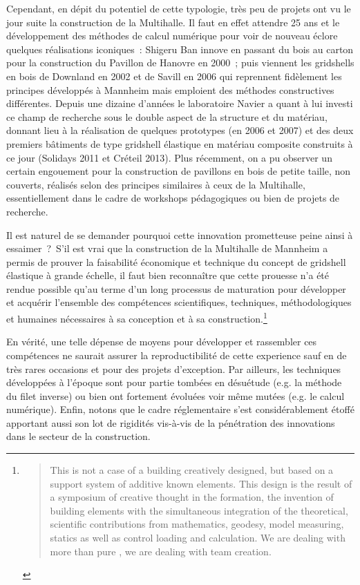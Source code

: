 Cependant, en dépit du potentiel de cette typologie, très peu de projets ont vu le jour suite la construction de la Multihalle. Il faut en effet attendre 25 ans et le développement des méthodes de calcul numérique pour voir de nouveau éclore quelques réalisations iconiques~: Shigeru Ban innove en passant du bois au carton pour la construction du Pavillon de Hanovre en 2000~; puis viennent les gridshells en bois de Downland en 2002 et de Savill en 2006 qui reprennent fidèlement les principes développés à Mannheim mais emploient des méthodes constructives différentes. Depuis une dizaine d'années le laboratoire Navier a quant à lui investi ce champ de recherche sous le double aspect de la structure et du matériau, donnant lieu à la réalisation de quelques prototypes (en 2006 et 2007) et des deux premiers bâtiments de type gridshell élastique en matériau composite construits à ce jour (Solidays 2011 et Créteil 2013). Plus récemment, on a pu observer un certain engouement pour la construction de pavillons en bois de petite taille, non couverts, réalisés selon des principes similaires à ceux de la Multihalle, essentiellement dans le cadre de workshops pédagogiques ou bien de projets de recherche.

Il est naturel de se demander pourquoi cette innovation prometteuse peine ainsi à essaimer~?~S'il est vrai que la construction de la Multihalle de Mannheim a permis de prouver la faisabilité économique et technique du concept de gridshell élastique à grande échelle, il faut bien reconnaître que cette prouesse n'a été rendue possible qu'au terme d'un long processus de maturation pour développer et acquérir l'ensemble des compétences scientifiques, techniques, méthodologiques et humaines nécessaires à sa conception et à sa construction.\footnote{\blockcquote[Georg Lewenton][p.~201]{IL13}{This is not a case of a building creatively designed, but based on a support system of additive known elements. This design is the result of a symposium of creative thought in the formation, the invention of building elements with the simultaneous integration of the theoretical, scientific contributions from mathematics, geodesy, model measuring, statics as well as control loading and calculation. We are dealing with more than pure , we are dealing with team creation.}}

En vérité, une telle dépense de moyens pour développer et rassembler ces compétences ne saurait assurer la reproductibilité de cette experience sauf en de très rares occasions et pour des projets d'exception. Par ailleurs, les techniques développées à l'époque sont pour partie tombées en désuétude (e.g. la méthode du filet inverse) ou bien ont fortement évoluées voir même mutées (e.g. le calcul numérique). Enfin, notons que le cadre réglementaire s'est considérablement étoffé apportant aussi son lot de rigidités vis-à-vis de la pénétration des innovations dans le secteur de la construction.

